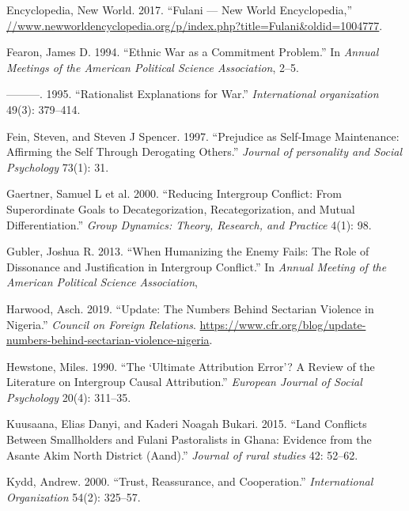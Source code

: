 \documentclass[11pt]{article}
\begin{document}
\leavevmode\hypertarget{ref-fulanisize2017}{}%
Encyclopedia, New World. 2017. ``Fulani --- New World Encyclopedia,''
\url{//www.newworldencyclopedia.org/p/index.php?title=Fulani\&oldid=1004777}.

\leavevmode\hypertarget{ref-fearon1994ethnic}{}%
Fearon, James D. 1994. ``Ethnic War as a Commitment Problem.'' In
\emph{Annual Meetings of the American Political Science Association},
2--5.

\leavevmode\hypertarget{ref-fearon1995rationalist}{}%
---------. 1995. ``Rationalist Explanations for War.''
\emph{International organization} 49(3): 379--414.

\leavevmode\hypertarget{ref-fein1997prejudice}{}%
Fein, Steven, and Steven J Spencer. 1997. ``Prejudice as Self-Image
Maintenance: Affirming the Self Through Derogating Others.''
\emph{Journal of personality and Social Psychology} 73(1): 31.

\leavevmode\hypertarget{ref-gaertner2000reducing}{}%
Gaertner, Samuel L et al. 2000. ``Reducing Intergroup Conflict: From
Superordinate Goals to Decategorization, Recategorization, and Mutual
Differentiation.'' \emph{Group Dynamics: Theory, Research, and Practice}
4(1): 98.

\leavevmode\hypertarget{ref-gubler2013humanizing}{}%
Gubler, Joshua R. 2013. ``When Humanizing the Enemy Fails: The Role of
Dissonance and Justification in Intergroup Conflict.'' In \emph{Annual
Meeting of the American Political Science Association},

\leavevmode\hypertarget{ref-council2019nigeria}{}%
Harwood, Asch. 2019. ``Update: The Numbers Behind Sectarian Violence in
Nigeria.'' \emph{Council on Foreign Relations}.
\url{https://www.cfr.org/blog/update-numbers-behind-sectarian-violence-nigeria}.

\leavevmode\hypertarget{ref-hewstone1990ultimate}{}%
Hewstone, Miles. 1990. ``The `Ultimate Attribution Error'? A Review of
the Literature on Intergroup Causal Attribution.'' \emph{European
Journal of Social Psychology} 20(4): 311--35.

\leavevmode\hypertarget{ref-kuusaana2015land}{}%
Kuusaana, Elias Danyi, and Kaderi Noagah Bukari. 2015. ``Land Conflicts
Between Smallholders and Fulani Pastoralists in Ghana: Evidence from the
Asante Akim North District (Aand).'' \emph{Journal of rural studies} 42:
52--62.

\leavevmode\hypertarget{ref-kydd2000trust}{}%
Kydd, Andrew. 2000. ``Trust, Reassurance, and Cooperation.''
\emph{International Organization} 54(2): 325--57.
\end{document}
